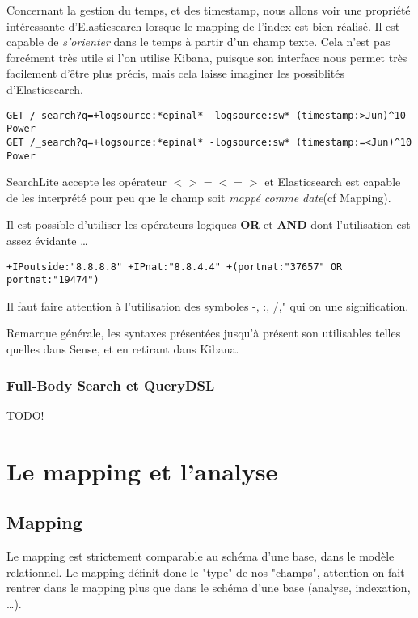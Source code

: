 Concernant la gestion du temps, et des timestamp, nous allons voir une propriété 
intéressante d'Elasticsearch lorsque le mapping de l'index est bien réalisé.
Il est capable de \textit{s'orienter} dans le temps à partir d'un champ texte.
Cela n'est pas forcément très utile si l'on utilise Kibana, puisque son interface
nous permet très facilement d'être plus précis, mais cela laisse imaginer les possiblités
d'Elasticsearch.


\begin{lstlisting}[style=code,label={lst:APIsearchliteexample5},caption={Le temps dans SearchLite}]
GET /_search?q=+logsource:*epinal* -logsource:sw* (timestamp:>Jun)^10 Power
GET /_search?q=+logsource:*epinal* -logsource:sw* (timestamp:=<Jun)^10 Power
\end{lstlisting}

SearchLite accepte les opérateur $< > =< =>$ et Elasticsearch est capable de les 
interprété pour peu que le champ soit \textit{mappé comme date}(cf Mapping).

Il est possible d'utiliser les opérateurs logiques \textbf{OR} et \textbf{AND} 
dont l'utilisation est assez évidante \ldots
\begin{lstlisting}[style=code,label={lst:APIsearchliteexample6},caption={Opérateurs logiques}]
+IPoutside:"8.8.8.8" +IPnat:"8.8.4.4" +(portnat:"37657" OR portnat:"19474")
\end{lstlisting}

Il faut faire attention à l'utilisation des symboles -, :, /," qui on une signification.


Remarque générale, les syntaxes présentées jusqu'à présent son utilisables telles
quelles dans Sense, et en retirant  dans Kibana.


\subsubsection{Full-Body Search et QueryDSL}
{\huge TODO!}

\section{Le mapping et l'analyse}
\subsection{Mapping}
Le mapping est strictement comparable au schéma d'une base, dans le modèle relationnel.
Le mapping définit donc le "type" de nos "champs", attention on fait rentrer dans 
le mapping plus que dans le schéma d'une base (analyse, indexation, \ldots).

